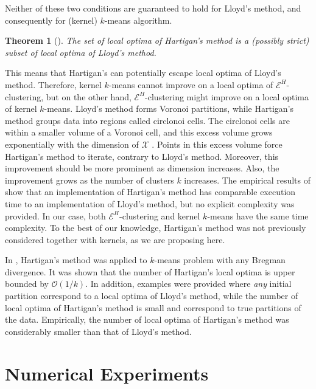 \documentclass{article}
\newtheorem{theorem}{Theorem}
\begin{document}
Neither of these two conditions are guaranteed to hold 
for Lloyd's method,
and consequently for (kernel) $k$-means algorithm. 

\begin{theorem}[\citet{Telgarsky}]
The set of local optima of Hartigan's method is a (possibly strict) subset
of local optima of Lloyd's method.
\end{theorem}

This means that Hartigan's can potentially 
escape local optima of Lloyd's method.
Therefore, kernel $k$-means cannot
improve on a local optima of $\mathcal{E}^H$-clustering, but on the other hand,
$\mathcal{E}^H$-clustering might improve on a local optima of 
kernel $k$-means. 
Lloyd's method forms Voronoi partitions,
while Hartigan's method groups data
into regions called circlonoi cells.
The circlonoi cells are within
a smaller volume of a Voronoi cell, and this excess volume grows
exponentially with the dimension of $\mathcal{X}$ 
\citep[Theorems 2.4 and 3.1]{Telgarsky}. 
Points in this excess volume
force Hartigan's method to iterate, contrary
to Lloyd's method. 
Moreover, this improvement should be more prominent as
dimension increases. Also, the improvement grows as the number of clusters
$k$ increases.
The empirical results of \citet{Telgarsky} show that 
an implementation of Hartigan's method has comparable execution time 
to an implementation of
Lloyd's method,
but no explicit complexity was provided. In our case, both
$\mathcal{E}^H$-clustering and kernel $k$-means
have the same time complexity. To the best of our knowledge, Hartigan's
method was not previously considered together with kernels, as we 
are proposing here.

In \citet{Slonin}, Hartigan's method was applied to $k$-means problem
with any Bregman divergence. It was shown that the number of Hartigan's
local optima is upper bounded by $\mathcal{O}(1/k)$. 
In addition, examples were provided where
\emph{any} initial partition correspond to a local optima of Lloyd's method,
while  
the number of local optima of Hartigan's method is small and 
correspond to true partitions of the data. Empirically, the number of
local optima of Hartigan's method was considerably smaller than that of Lloyd's
method.


\section{Numerical Experiments}
\label{sec:numerics}
\end{document}
